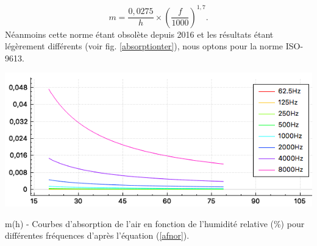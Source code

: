 \begin{equation} \label{afnor}
	m = \frac{0,0275}{h} \times (\frac{f}{1000})^{1,7}.
\end{equation}
Néanmoins cette norme étant obsolète depuis 2016 et les résultats étant légèrement différents (voir fig. \ref{absorptionter}), nous optons pour la norme ISO-9613. \\
%
\begin{figureth}
	\includegraphics[width=0.8\linewidth]{images/absorptionter}
	\caption{m(h) - Courbes d'absorption de l'air en fonction de l'humidité relative (\%) pour différentes fréquences d'après l'équation (\ref{afnor}).}
	\label{absorptionter}
\end{figureth}

